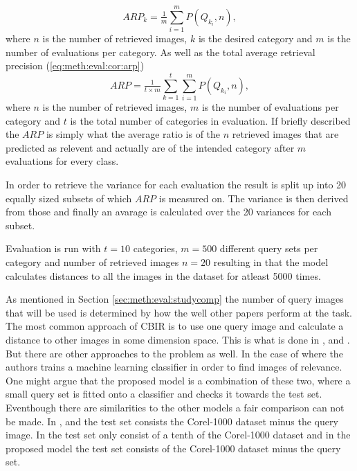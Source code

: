 \begin{equation}
\label{eq:meth:eval:cor:class_arp}
ARP_k = \tfrac{1}{m}\sum_{i=1}^{m}P(Q_{k_i}, n),
\end{equation}
where $n$ is the number of retrieved images, $k$ is the desired category and $m$ is the number of evaluations per category.
As well as the total average retrieval precision (\ref{eq:meth:eval:cor:arp})
\begin{equation}
\label{eq:meth:eval:cor:arp}
ARP = \tfrac{1}{t\times m}\sum_{k=1}^{t}\sum_{i=1}^{m}P(Q_{k_i}, n),
\end{equation}
where $n$ is the number of retrieved images, $m$ is the number of evaluations per category and $t$ is the total number of categories in evaluation. 
If briefly described the $ARP$ is simply what the average ratio is of the $n$ retrieved images that are predicted as relevent and actually are of the intended category after $m$ evaluations for every class.

In order to retrieve the variance for each evaluation the result is split up into 20 equally sized subsets of which $ARP$ is measured on. The variance is then derived from those and finally an avarage is calculated over the 20 variances for each subset. 

Evaluation is run with $t=10$ categories, $m=500$ different query sets per category and number of retrieved images $n=20$ resulting in that the model calculates distances to all the images in the dataset for atleast 5000 times.

As mentioned in Section \ref{sec:meth:eval:studycomp} the number of query images that will be used is determined by how the well other papers perform at the task. The most common approach of CBIR is to use one query image and calculate a distance to other images in some dimension space. This is what is done in \cite{wang2001simplicity}, \cite{subrahmanyam2013modified} and \cite{nagaraja2015low}. But there are other approaches to the problem as well. In the case of \cite{elalami2014new} where the authors trains a machine learning classifier in order to find images of relevance. One might argue that the proposed model is a combination of these two, where a small query set is fitted onto a classifier and checks it towards the test set. Eventhough there are similarities to the other models a fair comparison can not be made. In \cite{wang2001simplicity}, \cite{subrahmanyam2013modified} and \cite{nagaraja2015low} the test set consists the Corel-1000 dataset minus the query image. In \cite{elalami2014new} the test set only consist of a tenth of the Corel-1000 dataset and in the proposed model the test set consists of the Corel-1000 dataset minus the query set.
